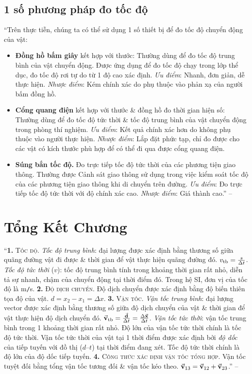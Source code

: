 \documentclass[oneside]{book}
\numberwithin{equation}{section}
\begin{document}
\subsection{1 số phương pháp đo tốc độ}
``Trên thực tiễn, chúng ta có thể sử dụng 1 số thiết bị để đo tốc độ chuyển động của vật:
\begin{itemize}
	\item \textbf{Đồng hồ bấm giây} kết hợp với thước: Thường dùng để đo tốc độ trung bình của vật chuyển động. Được ứng dụng để đo tốc độ chạy trong lớp thể dục, đo tốc độ rơi tự do từ 1 độ cao xác định. \textit{Ưu điểm}: Nhanh, đơn giản, dễ thực hiện. \textit{Nhược điểm}: Kém chính xác do phụ thuộc vào phản xạ của người bấm đồng hồ.
	\item \textbf{Cổng quang điện} kết hợp với thước \& đồng hồ đo thời gian hiện số: Thường dùng để đo tốc độ tức thời \& tốc độ trung bình của vật chuyển động trong phòng thí nghiệm. \textit{Ưu điểm}: Kết quả chính xác hơn do không phụ thuộc vào người thực hiện. \textit{Nhược điểm}: Lắp đặt phức tạp, chỉ đo được cho các vật có kích thước phù hợp để có thể đi qua được cổng quang điện.
	\item \textbf{Súng bắn tốc độ.} Đo trực tiếp tốc độ tức thời của các phương tiện giao thông. Thường được Cảnh sát giao thông sử dụng trong việc kiểm soát tốc độ của các phương tiện giao thông khi di chuyển trên đường. \textit{Ưu điểm}: Đo trực tiếp tốc độ tức thời với độ chính xác cao. \textit{Nhược điểm}: Giá thành cao.'' -- \cite[pp. 38--39]{SGK_Vat_Ly_10_Chan_Troi_Sang_Tao}
\end{itemize}

\section{Tổng Kết Chương}
``\textbf{1.} \textsc{Tốc độ.} \textit{Tốc độ trung bình}: đại lượng được xác định bằng thương số giữa quãng đường vật đi được \& thời gian để vật thực hiện quãng đường đó. $v_{\rm tb} = \frac{s}{\Delta t}$. \textit{Tốc độ tức thời} ($v$): tốc độ trung bình tính trong khoảng thời gian rất nhỏ, diễn tả sự nhanh, chậm của chuyển động tại thời điểm đó. Trong hệ SI, đơn vị của tốc độ là m\texttt{/}s. \textbf{2.} \textsc{Độ dịch chuyển.} Độ dịch chuyển được xác định bằng độ biến thiên tọa độ của vật. $d = x_2 - x_1 = \Delta x$. \textbf{3.} \textsc{Vận tốc.} \textit{Vận tốc trung bình}: đại lượng vector được xác định bằng thương số giữa độ dịch chuyển của vật \& thời gian để vật thực hiện độ dịch chuyển đó. $\vec{\bf v}_{\rm tb} = \frac{\vec{\bf d}}{\Delta t} = \frac{\Delta\vec{\bf x}}{\Delta t}$. \textit{Vận tốc tức thời}: vận tốc trung bình trong 1 khoảng thời gian rất nhỏ. Độ lớn của vận tốc tức thời chính là tốc độ tức thời. Vận tốc tức thời của vật tại 1 thời điểm được xác định bởi \textit{độ dốc} của tiếp tuyến với đồ thị ($d$--$t$) tại thời điểm đang xét. Tốc độ tức thời chính là độ lớn của độ dốc tiếp tuyến. \textbf{4.} \textsc{Công thức xác định vận tốc tổng hợp.} Vận tốc tuyệt đối bằng tổng vận tốc tương đối \& vận tốc kéo theo. $\vec{\bf v}_{13} = \vec{\bf v}_{12} + \vec{\bf v}_{23}$.'' -- \cite[p. 39]{SGK_Vat_Ly_10_Chan_Troi_Sang_Tao}
\end{document}
